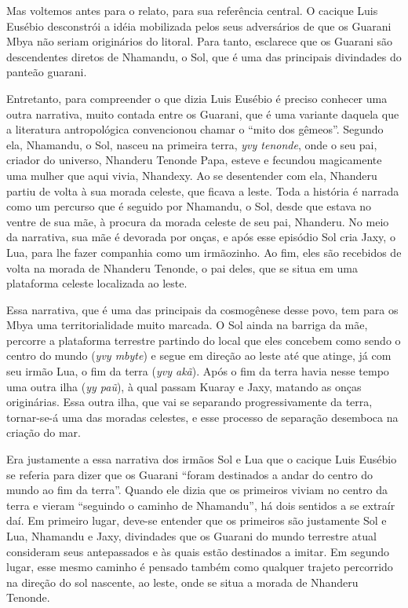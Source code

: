 Mas voltemos antes para o relato, para sua referência central. O cacique
Luis Eusébio desconstrói a idéia mobilizada pelos seus adversários de
que os Guarani Mbya não seriam originários do litoral. Para tanto,
esclarece que os Guarani são descendentes diretos de Nhamandu, o Sol,
que é uma das principais divindades do panteão guarani.

Entretanto, para compreender o que dizia Luis Eusébio é preciso conhecer
uma outra narrativa, muito contada entre os Guarani, que é uma variante
daquela que a literatura antropológica convencionou chamar o ``mito dos
gêmeos''. Segundo ela, Nhamandu, o Sol, nasceu na primeira terra,
\emph{yvy tenonde}, onde o seu pai, criador do universo, Nhanderu
Tenonde Papa, esteve e fecundou magicamente uma mulher que aqui vivia,
Nhandexy. Ao se desentender com ela, Nhanderu partiu de volta à sua
morada celeste, que ficava a leste. Toda a história é narrada como um
percurso que é seguido por Nhamandu, o Sol, desde que estava no ventre
de sua mãe, à procura da morada celeste de seu pai, Nhanderu. No meio da
narrativa, sua mãe é devorada por onças, e após esse episódio Sol cria
Jaxy, o Lua, para lhe fazer companhia como um irmãozinho. Ao fim, eles
são recebidos de volta na morada de Nhanderu Tenonde, o pai deles, que
se situa em uma plataforma celeste localizada ao leste.

Essa narrativa, que é uma das principais da cosmogênese desse povo, tem
para os Mbya uma territorialidade muito marcada. O Sol ainda na barriga
da mãe, percorre a plataforma terrestre partindo do local que eles
concebem como sendo o centro do mundo (\emph{yvy mbyte}) e segue em
direção ao leste até que atinge, já com seu irmão Lua, o fim da terra
(\emph{yvy akã}). Após o fim da terra havia nesse tempo uma outra ilha
(\emph{yy paũ}), à qual passam Kuaray e Jaxy, matando as onças
originárias. Essa outra ilha, que vai se separando progressivamente da
terra, tornar-se-á uma das moradas celestes, e esse processo de
separação desemboca na criação do mar.

Era justamente a essa narrativa dos irmãos Sol e Lua que o cacique Luis
Eusébio se referia para dizer que os Guarani ``foram destinados a andar
do centro do mundo ao fim da terra''. Quando ele dizia que os primeiros
viviam no centro da terra e vieram ``seguindo o caminho de Nhamandu'',
há dois sentidos a se extraír daí. Em primeiro lugar, deve-se entender
que os primeiros são justamente Sol e Lua, Nhamandu e Jaxy, divindades
que os Guarani do mundo terrestre atual consideram seus antepassados e
às quais estão destinados a imitar. Em segundo lugar, esse mesmo caminho
é pensado também como qualquer trajeto percorrido na direção do sol
nascente, ao leste, onde se situa a morada de Nhanderu Tenonde.

